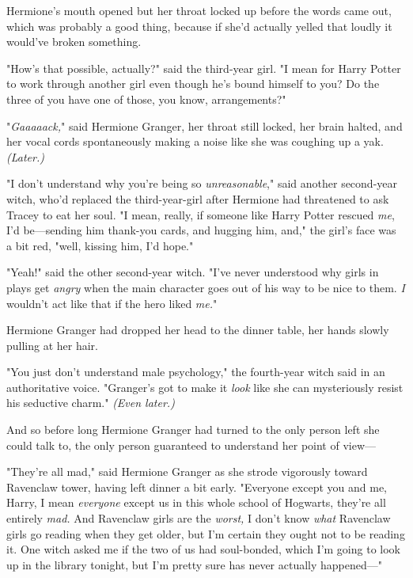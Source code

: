 Hermione's mouth opened but her throat locked up before the words came out, 
which was probably a good thing, because if she'd actually yelled that loudly 
it would've broken something.

"How's that possible, actually?" said the third-year girl. "I mean for Harry 
Potter to work through another girl even though he's bound himself to you? Do 
the three of you have one of those, you know, arrangements?"

"\emph{Gaaaaack,}" said Hermione Granger, her throat still locked, her brain 
halted, and her vocal cords spontaneously making a noise like she was coughing 
up a yak.
\sbreak
\emph{(Later.)}

"I don't understand why you're being so \emph{unreasonable}," said another 
second-year witch, who'd replaced the third-year-girl after Hermione had 
threatened to ask Tracey to eat her soul. "I mean, really, if someone like 
Harry Potter rescued \emph{me}, I'd be---sending him thank-you cards, and 
hugging him, and," the girl's face was a bit red, "well, kissing him, I'd hope."

"Yeah!" said the other second-year witch. "I've never understood why girls in 
plays get \emph{angry} when the main character goes out of his way to be nice 
to them. \emph{I} wouldn't act like that if the hero liked \emph{me.}"

Hermione Granger had dropped her head to the dinner table, her hands slowly 
pulling at her hair.

"You just don't understand male psychology," the fourth-year witch said in an 
authoritative voice. "Granger's got to make it \emph{look} like she can 
mysteriously resist his seductive charm."
\sbreak
\emph{(Even later.)}

And so before long Hermione Granger had turned to the only person left she 
could talk to, the only person guaranteed to understand her point of view---

"They're all mad," said Hermione Granger as she strode vigorously toward 
Ravenclaw tower, having left dinner a bit early. "Everyone except you and me, 
Harry, I mean \emph{everyone} except us in this whole school of Hogwarts, 
they're all entirely \emph{mad.} And Ravenclaw girls are the \emph{worst,} I 
don't know \emph{what} Ravenclaw girls go reading when they get older, but I'm 
certain they ought not to be reading it. One witch asked me if the two of us 
had soul-bonded, which I'm going to look up in the library tonight, but I'm 
pretty sure has never actually happened---"

